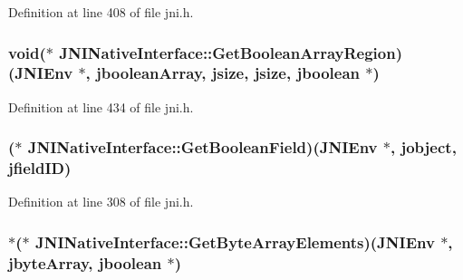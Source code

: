 Definition at line 408 of file jni.\-h.

\hypertarget{struct_j_n_i_native_interface_a4c97dfc2e3e5d389dba7d9c6c6ae1483}{
\subsubsection[{Get\-Boolean\-Array\-Region}]{\setlength{\rightskip}{0pt plus 5cm}void($\ast$ J\-N\-I\-Native\-Interface\-::\-Get\-Boolean\-Array\-Region)({\bf J\-N\-I\-Env} $\ast$, {\bf jboolean\-Array}, {\bf jsize}, {\bf jsize}, {\bf jboolean} $\ast$)}}\label{struct_j_n_i_native_interface_a4c97dfc2e3e5d389dba7d9c6c6ae1483}


Definition at line 434 of file jni.\-h.

\hypertarget{struct_j_n_i_native_interface_a509951f5f9765b663cd112f7cd27941a}{
\subsubsection[{Get\-Boolean\-Field}]{($\ast$ J\-N\-I\-Native\-Interface\-::\-Get\-Boolean\-Field)({\bf J\-N\-I\-Env} $\ast$, {\bf jobject}, {\bf jfield\-I\-D})}}\label{struct_j_n_i_native_interface_a509951f5f9765b663cd112f7cd27941a}


Definition at line 308 of file jni.\-h.

\hypertarget{struct_j_n_i_native_interface_a97f3b4583e399a16c60bc5ea670c878f}{
\subsubsection[{Get\-Byte\-Array\-Elements}]{$\ast$($\ast$ J\-N\-I\-Native\-Interface\-::\-Get\-Byte\-Array\-Elements)({\bf J\-N\-I\-Env} $\ast$, {\bf jbyte\-Array}, {\bf jboolean} $\ast$)}}\label{struct_j_n_i_native_interface_a97f3b4583e399a16c60bc5ea670c878f}


